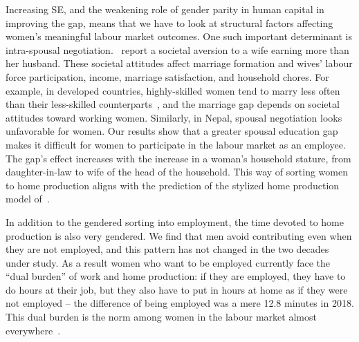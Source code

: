 Increasing SE, and the weakening role of gender parity in human capital in improving the gap, means that we have to look at structural factors affecting women's meaningful labour market outcomes. One such important determinant is intra-spousal negotiation.~\citet{Bertrand2015} report a societal aversion to a wife earning more than her husband. These societal attitudes affect marriage formation and wives’ labour force participation, income, marriage satisfaction, and household chores. For example, in developed countries, highly-skilled women tend to marry less often than their less-skilled counterparts~\citep{Bertrand2020social}, and the marriage gap depends on societal attitudes toward working women. Similarly, in Nepal, spousal negotiation looks unfavorable for women. Our results show that a greater spousal education gap makes it difficult for women to participate in the labour market as an employee. The gap’s effect increases with the increase in a woman’s household stature, from daughter-in-law to wife of the head of the household. This way of sorting women to home production aligns with the prediction of the stylized home production model of~\citet{Cortes2020}.\par

In addition to the gendered sorting into employment, the time devoted to home production is also very gendered. We find that men avoid contributing even when they are not employed, and this pattern has not changed in the two decades under study. As a result women who want to be employed currently face the ``dual burden'' of work and home production: if they are employed, they have to do hours at their job, but they also have to put in hours at home as if they were not employed -- the difference of being employed was a mere 12.8 minutes in 2018. This dual burden is the norm among women in the labour market almost everywhere~\citep{Hochschild2012}.\par

